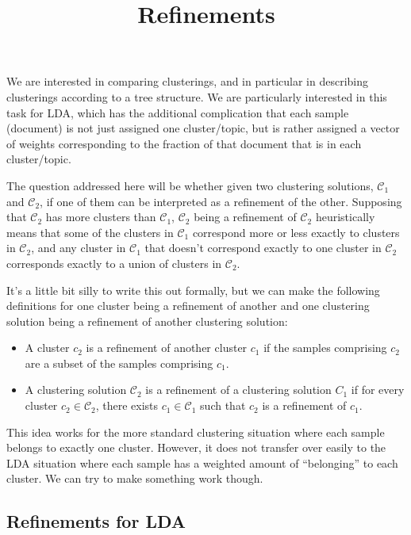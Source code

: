 \documentclass[11pt]{article}
\title{Refinements}
\begin{document}
\maketitle

We are interested in comparing clusterings, and in particular in describing clusterings according to a tree structure.
We are particularly interested in this task for LDA, which has the additional complication that each sample (document) is not just assigned one cluster/topic, but is rather assigned a vector of weights corresponding to the fraction of that document that is in each cluster/topic.

The question addressed here will be whether given two clustering solutions, $\mathcal C_1$ and $\mathcal C_2$, if one of them can be interpreted as a refinement of the other.
Supposing that $\mathcal C_2$ has more clusters than $\mathcal C_1$, $\mathcal C_2$ being a refinement of $\mathcal C_2$ heuristically means that some of the clusters in $\mathcal C_1$ correspond more or less exactly to clusters in $\mathcal C_2$, and any cluster in $\mathcal C_1$ that doesn't correspond exactly to one cluster in $\mathcal C_2$ corresponds exactly to a union of clusters in $\mathcal C_2$.

It's a little bit silly to write this out formally, but we can make the following definitions for one cluster being a refinement of another and one clustering solution being a refinement of another clustering solution:

\begin{itemize}
\item A cluster $c_2$ is a refinement of another cluster $c_1$ if the samples comprising $c_2$ are a subset of the samples comprising $c_1$.

\item A clustering solution $\mathcal C_2$ is a refinement of a clustering solution $C_1$ if for every cluster $c_2 \in \mathcal C_2$, there exists $c_1\in \mathcal C_1$ such that $c_2$ is a refinement of $c_1$.
\end{itemize}

This idea works for the more standard clustering situation where each sample belongs to exactly one cluster.
However, it does not transfer over easily to the LDA situation where each sample has a weighted amount of ``belonging'' to each cluster.
We can try to make something work though.

\subsection*{Refinements for LDA}
\end{document}
